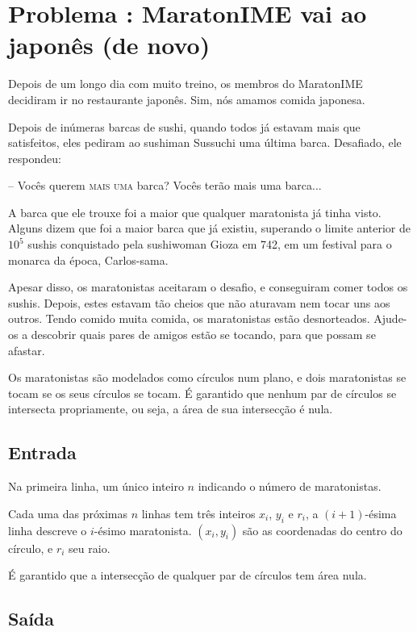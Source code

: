 \section*{Problema \proxLetra: MaratonIME vai ao japonês (de novo)}

Depois de um longo dia com muito treino, os membros do MaratonIME decidiram ir no restaurante japonês. Sim, nós amamos comida japonesa.

Depois de inúmeras barcas de sushi, quando todos já estavam mais que satisfeitos, eles pediram ao sushiman Sussuchi uma última barca. Desafiado, ele respondeu:

-- Vocês querem \textsc{mais uma} barca? Vocês terão mais uma barca...

A barca que ele trouxe foi a maior que qualquer maratonista já tinha visto. Alguns dizem que foi a maior barca que já existiu, superando o limite anterior de $10^5$ sushis conquistado pela sushiwoman Gioza em 742, em um festival para o monarca da época, Carlos-sama.

Apesar disso, os maratonistas aceitaram o desafio, e conseguiram comer todos os sushis. Depois, estes estavam tão cheios que não aturavam nem tocar uns aos outros. Tendo comido muita comida, os maratonistas estão desnorteados. Ajude-os a descobrir quais pares de amigos estão se tocando, para que possam se afastar.

Os maratonistas são modelados como círculos num plano, e dois maratonistas se tocam se os seus círculos se tocam. É garantido que nenhum par de círculos se intersecta propriamente, ou seja, a área de sua intersecção é nula.

\subsection*{Entrada}

Na primeira linha, um único inteiro $n$ indicando o número de maratonistas.

Cada uma das próximas $n$ linhas tem três inteiros $x_i$, $y_i$ e $r_i$, a $(i + 1)$-ésima linha descreve o $i$-ésimo maratonista. $(x_i, y_i)$ são as coordenadas do centro do círculo, e $r_i$ seu raio.

É garantido que a intersecção de qualquer par de círculos tem área nula.

\subsection*{Saída}

